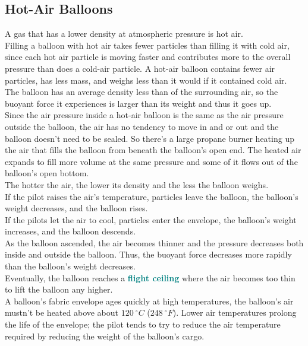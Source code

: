 \documentclass[12pt]{article}
\theoremstyle{definition}
\newcommand{\defnterm}[1]{\textbf{\textcolor{teal}{#1}}\index{#1}}
\begin{document}
\subsection{Hot-Air Balloons}
A gas that has a lower density at atmospheric pressure is hot air. \\
Filling a balloon with hot air takes fewer particles than filling it with cold air, since each hot air particle is moving faster and contributes more to the overall pressure than does a cold-air particle.
A hot-air balloon contains fewer air particles, has less mass, and weighs less than it would if it contained cold air. \\
The balloon has an average density less than of the surrounding air, so the buoyant force it experiences is larger than its weight and thus it goes up. \\
Since the air pressure inside a hot-air balloon is the same as the air pressure outside the balloon, the air has no tendency to move in and or out and the balloon doesn't need to be sealed.
So there's a large propane burner heating up the air that fills the balloon from beneath the balloon's open end.
The heated air expands to fill more volume at the same pressure and some of it flows out of the balloon's open bottom. \\

The hotter the air, the lower its density and the less the balloon weighs. \\
If the pilot raises the air's temperature, particles leave the balloon, the balloon's weight decreases, and the balloon rises. \\
If the pilots let the air to cool, particles enter the envelope, the balloon's weight increases, and the balloon descends. \\

As the balloon ascended, the air becomes thinner and the pressure decreases both inside and outside the balloon.
Thus, the buoyant force decreases more rapidly than the balloon's weight decreases. \\
Eventually, the balloon reaches a \defnterm{flight ceiling} where the air becomes too thin to lift the balloon any higher. \\

A balloon's fabric envelope ages quickly at high temperatures, the balloon's air mustn't be heated above about $120~^{\circ}C$ ($248~^{\circ}F$).
Lower air temperatures prolong the life of the envelope;
the pilot tends to try to reduce the air temperature required by reducing the weight of the balloon's cargo.
\end{document}
